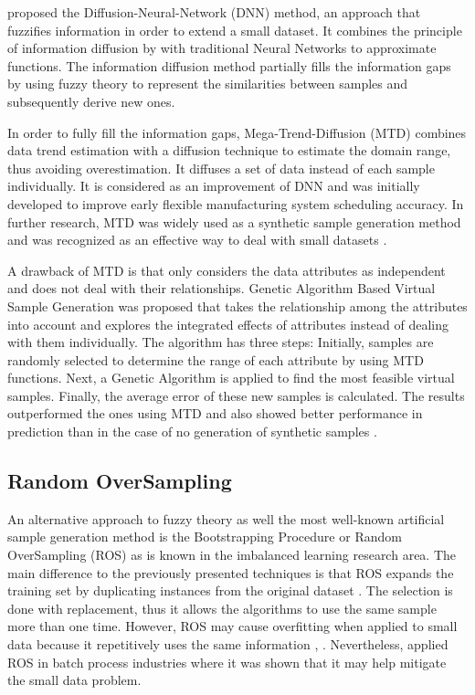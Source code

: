 \documentclass[parskip=full]{scrartcl}
\begin{document}
\cite{Huang.2004} proposed the Diffusion-Neural-Network (DNN) method, an approach that fuzzifies information in order to extend a small dataset. It combines the principle of information diffusion by \cite{Huang.1997} with traditional Neural Networks to approximate functions. The information diffusion method partially fills the information gaps by using fuzzy theory to represent the similarities between samples and subsequently derive new ones.

In order to fully fill the information gaps, Mega-Trend-Diffusion (MTD) \cite{Li.2007} combines data trend estimation with a diffusion technique to estimate the domain range, thus avoiding overestimation. It diffuses a set of data instead of each sample individually. It is considered as an improvement of DNN and was initially developed to improve early flexible manufacturing system scheduling accuracy. In further research, MTD was widely used as a synthetic sample generation method and was recognized as an effective way to deal with small datasets \cite{AbdulLateh.2017}.

A drawback of MTD is that only considers the data attributes as independent and does not deal with their relationships. Genetic Algorithm Based Virtual Sample Generation was proposed that takes the relationship among the attributes into account and explores the integrated effects of attributes instead of dealing with them individually. The algorithm has three steps: Initially, samples are randomly selected to determine the range of each attribute by using MTD functions. Next, a Genetic Algorithm is applied to find the most feasible virtual samples. Finally, the average error of these new samples is calculated. The results outperformed the ones using MTD and also showed better performance in prediction than in the case of no generation of synthetic samples \cite{Li.2014, Lin.2010}.

\subsection{Random OverSampling}

An alternative approach to fuzzy theory as well the most well-known artificial sample generation method is the Bootstrapping Procedure \cite{AbdulLateh.2017} or Random OverSampling (ROS) as is known in the imbalanced learning research area. The main difference to the previously presented techniques is that ROS expands the training set by duplicating instances from the original dataset \cite{Efron.1993}. The selection is done with replacement, thus it allows the algorithms to use the same sample more than one time. However, ROS may cause overfitting when applied to small data because it repetitively uses the same information \cite{Tsai.2015}, \cite{Li.2018}. Nevertheless, \cite{Ivanescu.2006} applied ROS in batch process industries where it was shown that it may help mitigate the small data problem.
\end{document}
